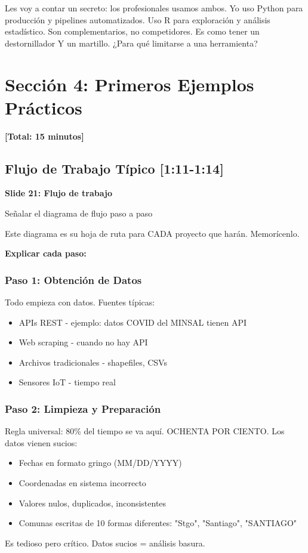 \documentclass[11pt,a4paper]{article}
\newcommand{\tiempo}[1]{\textcolor{timecolor}{\faIcon{clock} \textbf{[#1]}}}
\newcommand{\decir}[1]{\begin{tcolorbox}[colback=blue!5,colframe=usachblue,title={\faIcon{microphone} DECIR}]#1\end{tcolorbox}}
\newcommand{\hacer}[1]{\begin{tcolorbox}[colback=green!5,colframe=green!50!black,title={\faIcon{hand-point-right} HACER}]#1\end{tcolorbox}}
\begin{document}
\decir{Les voy a contar un secreto: los profesionales usamos ambos. Yo uso Python para producción y pipelines automatizados. Uso R para exploración y análisis estadístico. Son complementarios, no competidores. Es como tener un destornillador Y un martillo. ¿Para qué limitarse a una herramienta?}

\newpage

\section{Sección 4: Primeros Ejemplos Prácticos}

\tiempo{Total: 15 minutos}

\subsection{Flujo de Trabajo Típico \tiempo{1:11-1:14}}

\textbf{Slide 21: Flujo de trabajo}

\hacer{Señalar el diagrama de flujo paso a paso}

\decir{Este diagrama es su hoja de ruta para CADA proyecto que harán. Memorícenlo.}

\textbf{Explicar cada paso:}

\subsubsection{Paso 1: Obtención de Datos}

\decir{Todo empieza con datos. Fuentes típicas:
\begin{itemize}
    \item APIs REST - ejemplo: datos COVID del MINSAL tienen API
    \item Web scraping - cuando no hay API
    \item Archivos tradicionales - shapefiles, CSVs
    \item Sensores IoT - tiempo real
\end{itemize}}

\subsubsection{Paso 2: Limpieza y Preparación}

\decir{Regla universal: 80\% del tiempo se va aquí. OCHENTA POR CIENTO. Los datos vienen sucios:
\begin{itemize}
    \item Fechas en formato gringo (MM/DD/YYYY)
    \item Coordenadas en sistema incorrecto
    \item Valores nulos, duplicados, inconsistentes
    \item Comunas escritas de 10 formas diferentes: "Stgo", "Santiago", "SANTIAGO"
\end{itemize}

Es tedioso pero crítico. Datos sucios = análisis basura.}
\end{document}
